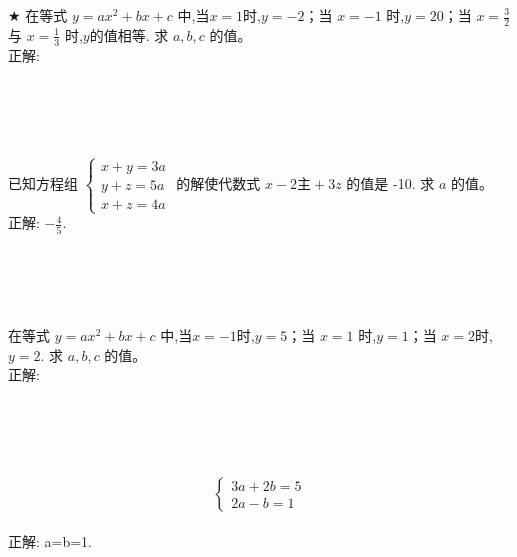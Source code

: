 \item {
    $\bigstar$
    在等式 $y=ax^2+bx+c$ 中,当$x=1$时,$y=-2$；当 $x=-1$ 时,$y=20$；当 $x=\frac32$ 与 $x=\frac13$ 时,$y$的值相等. 求 $a,b,c$ 的值。
    \ifshowSolution
        \fangsong{}
        \\
        正解: 
    \else
        \\ \\ \\ \\ \\
    \fi
}

\item {
    已知方程组
    $\begin{cases}
        x+y=3a \\ 
        y+z=5a \\ 
        x+z=4a 
    \end{cases}$
    的解使代数式 $x-2主+3z$ 的值是 -10.  求 $a$ 的值。
    \ifshowSolution
        \fangsong{}
        \\
        正解: $-\frac45$.
    \else
        \\ \\ \\ \\ \\
    \fi
}

\item {
    在等式 $y=ax^2+bx+c$ 中,当$x=-1$时,$y=5$；当 $x=1$ 时,$y=1$；当 $x=2$时,$y=2$. 求 $a,b,c$ 的值。
    \ifshowSolution
        \fangsong{}
        \\
        正解: 
    \else
        \\ \\ \\ \\ \\
    \fi
}

\item {
    \[\left\{
        \begin{array}{l}
            3a + 2b = 5 \\
            2a - b = 1
        \end{array}
    \right.\]
    \ifshowSolution
        \fangsong{}
        \\
        正解: a=b=1.
    \else
        \\ \\ \\ \\ \\
    \fi
}

